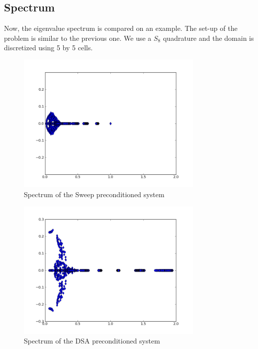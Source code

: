 \subsection{Spectrum}
Now, the eigenvalue spectrum is compared on an example. The set-up of the
problem is similar to the previous one. We use a $S_8$ quadrature and the
domain is discretized using 5 by 5 cells.

\begin{figure}[H]
\centering
\includegraphics[width=9cm]{s8_5_5}
\caption{Spectrum of the Sweep preconditioned system}
\end{figure}


\begin{figure}[H]
\centering
\includegraphics[width=9cm]{d_s8_5_5}
\caption{Spectrum of the DSA preconditioned system}
\end{figure}


